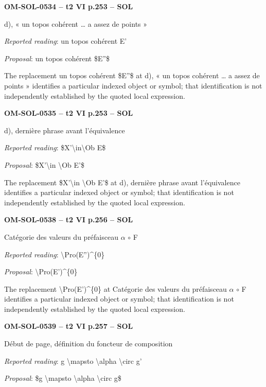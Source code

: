 \par\noindent\textbf{OM-SOL-0534 -- t2 VI p.253 -- SOL}\par
d), « un topos cohérent … a assez de points »\par
\emph{Reported reading}: un topos cohérent E'\par
\emph{Proposal}: un topos cohérent \$E''\$\par
The replacement un topos cohérent \$E''\$ at d), « un topos cohérent … a assez de points » identifies a particular indexed object or symbol; that identification is not independently established by the quoted local expression.\par
\par\noindent\textbf{OM-SOL-0535 -- t2 VI p.253 -- SOL}\par
d), dernière phrase avant l'équivalence\par
\emph{Reported reading}: \$X'\textbackslash{}in\textbackslash{}Ob E\$\par
\emph{Proposal}: \$X'\textbackslash{}in \textbackslash{}Ob E'\$\par
The replacement \$X'\textbackslash{}in \textbackslash{}Ob E'\$ at d), dernière phrase avant l'équivalence identifies a particular indexed object or symbol; that identification is not independently established by the quoted local expression.\par
\par\noindent\textbf{OM-SOL-0538 -- t2 VI p.256 -- SOL}\par
Catégorie des valeurs du préfaisceau \ensuremath{\alpha} \ensuremath{\circ} F\par
\emph{Reported reading}: \textbackslash{}Pro(E'')\textasciicircum{}\{0\}\par
\emph{Proposal}: \textbackslash{}Pro(E')\textasciicircum{}\{0\}\par
The replacement \textbackslash{}Pro(E')\textasciicircum{}\{0\} at Catégorie des valeurs du préfaisceau \ensuremath{\alpha} \ensuremath{\circ} F identifies a particular indexed object or symbol; that identification is not independently established by the quoted local expression.\par
\par\noindent\textbf{OM-SOL-0539 -- t2 VI p.257 -- SOL}\par
Début de page, définition du foncteur de composition\par
\emph{Reported reading}: g \textbackslash{}mapsto \textbackslash{}alpha \textbackslash{}circ g'\par
\emph{Proposal}: \$g \textbackslash{}mapsto \textbackslash{}alpha \textbackslash{}circ g\$\par

